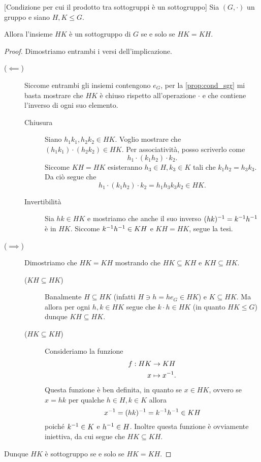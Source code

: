 \begin{proposition}\label{prop:cond_prod_sgr_e'_sgr}
    [Condizione per cui il prodotto tra sottogruppi è un sottogruppo] Sia $(G, \cdot)$ un gruppo e siano $H,K \leq G$.

    Allora l'insieme $HK$ è un sottogruppo di $G$ se e solo se $HK = KH$.
\end{proposition}
\begin{proof}
    Dimostriamo entrambi i versi dell'implicazione.
    \begin{description}
        \item[($\impliedby$)] Siccome entrambi gli insiemi contengono $e_G$, per la \autoref{prop:cond_sgr} mi basta mostrare che $HK$ è chiuso rispetto all'operazione $\cdot$ e che contiene l'inverso di ogni suo elemento. 
        \begin{description}
            \item[Chiusura] Siano $h_1k_1, h_2k_2 \in HK$. Voglio mostrare che $(h_1k_1) \cdot (h_2k_2) \in HK$. Per associatività, posso scriverlo come \[
                h_1 \cdot (k_1h_2) \cdot k_2.    
            \] Siccome $KH = HK$ esisteranno $h_3 \in H, k_3 \in K$ tali che $k_1h_2 = h_3k_3$. Da ciò segue che \[
                h_1 \cdot (k_1h_2) \cdot k_2 = h_1h_3k_3k_2 \in HK.
            \]
            \item[Invertibilità] Sia $hk \in HK$ e mostriamo che anche il suo inverso $(hk)^{-1} = k^{-1} h^{-1}$ è in $HK$. Siccome $k^{-1} h^{-1} \in KH$ e $KH = HK$, segue la tesi.
        \end{description}
        \item[($\implies$)] Dimostriamo che $HK = KH$ mostrando che $HK \subseteq KH$ e $KH \subseteq HK$.
        \begin{description}
            \item[($KH \subseteq HK$)] Banalmente $H \subseteq HK$ (infatti $H \ni h = he_G \in HK$) e $K \subseteq HK$. Ma allora per ogni $h, k \in HK$ segue che $k \cdot h \in HK$ (in quanto $HK \leq G$) dunque $KH \subseteq HK$.
            \item[($HK \subseteq KH$)] Consideriamo la funzione \begin{align*}
                f : HK &\to KH\\
                x &\mapsto x^{-1}.
            \end{align*} Questa funzione è ben definita, in quanto se $x \in HK$, ovvero se $x = hk$ per qualche $h \in H, k \in K$ allora \[
                x^{-1} = (hk)^{-1} = k^{-1} h^{-1} \in KH    
            \] poiché $k^{-1} \in K$ e $h^{-1} \in H$. Inoltre questa funzione è ovviamente iniettiva, da cui segue che $HK \subseteq KH$.
        \end{description}
    \end{description}
    Dunque $HK$ è sottogruppo se e solo se $HK = KH$.
\end{proof}